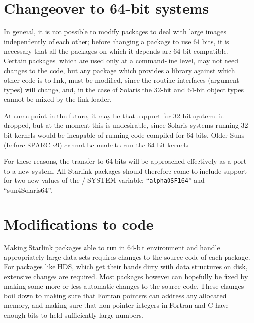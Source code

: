 \documentclass[twoside,11pt]{article}
\newcommand{\xref}[3]{#1}
\renewcommand{\_}{\texttt{\symbol{95}}}
\begin{document}
\section{Changeover to 64-bit systems}

In general, it is not possible to modify packages to deal with large
images independently of each other;
before changing a package to use 64 bits, it is necessary 
that all the packages on which it depends are 64-bit compatible.
Certain packages, which are used only at a command-line level, 
may not need changes to the code, but any package which provides a library 
against which other code is to link, must be modified,
since the routine interfaces (argument types) will change, 
and, in the case of Solaris
the 32-bit and 64-bit object types cannot be mixed by the link loader.

At some point in the future, it may be that support for 32-bit systems
is dropped, but at the moment this is undesirable, since 
Solaris systems running 32-bit kernels would be incapable of running
code compiled for 64 bits.  
Older Suns (before SPARC v9) cannot be made to run the 64-bit kernels.

For these reasons, the transfer to 64 bits will be approached
effectively as a port to a new system.  All Starlink packages should
therefore come to 
include support for two new values of the /
SYSTEM variable: ``{\tt alpha\_OSF1\_64}'' and ``{sun4\_Solaris\_64}''.



\section{Modifications to code\label{sec:modificienda}}

Making Starlink packages able to run in 64-bit environment and 
handle appropriately large data sets requires changes to the source
code of each package.
For packages like \xref{HDS}{sun92}{}, 
which get their hands dirty with data structures on disk,
extensive changes are required.
Most packages however can hopefully be fixed by making some more-or-less
automatic changes to the source code.
These changes boil down to making sure that Fortran pointers 
can address any allocated memory,
and making sure that non-pointer integers in Fortran and C 
have enough bits to hold sufficiently large numbers.
\end{document}
